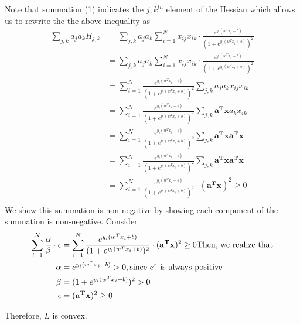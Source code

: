 \documentclass{article}
\begin{document}
Note that summation (1) indicates the \(j,k^{th}\) element of the Hessian which allows us to rewrite the the above inequality as
\begin{align*}
  \sum_{j,k}a_ja_kH_{j,k} 
  &= \sum_{j,k}a_ja_k\sum_{i=1}^{N}x_{ij}x_{ik}\cdot\frac{e^{y_{i}(w^{T}x_{i}+b)}}{(1+e^{y_{i}(w^{T}x_{i}+b)})^{2}}\\
  &= \sum_{j,k}a_ja_k\sum_{i=1}^{N}x_{ij}x_{ik}\cdot\frac{e^{y_{i}(w^{T}x_{i}+b)}}{(1+e^{y_{i}(w^{T}x_{i}+b)})^{2}}\\
  &= \sum_{i=1}^{N}\frac{e^{y_{i}(w^{T}x_{i}+b)}}{(1+e^{y_{i}(w^{T}x_{i}+b)})^{2}}\sum_{j,k}a_ja_kx_{ij}x_{ik}\\
  &= \sum_{i=1}^{N}\frac{e^{y_{i}(w^{T}x_{i}+b)}}{(1+e^{y_{i}(w^{T}x_{i}+b)})^{2}}\sum_{j,k}\mathbf{a^Tx}a_kx_{ik}\\
  &= \sum_{i=1}^{N}\frac{e^{y_{i}(w^{T}x_{i}+b)}}{(1+e^{y_{i}(w^{T}x_{i}+b)})^{2}}\sum_{j,k}\mathbf{a^Tx}\mathbf{a^Tx}\\
  &= \sum_{i=1}^{N}\frac{e^{y_{i}(w^{T}x_{i}+b)}}{(1+e^{y_{i}(w^{T}x_{i}+b)})^{2}}\sum_{j,k}\mathbf{a^Tx}\mathbf{a^Tx}\\
  &= \sum_{i=1}^{N}\frac{e^{y_{i}(w^{T}x_{i}+b)}}{(1+e^{y_{i}(w^{T}x_{i}+b)})^{2}}\cdot(\mathbf{a^Tx})^2 \geq 0\\
\end{align*}
We show this summation is non-negative by showing each component of the summation is non-negative. Consider
\begin{align*}
  \sum_{i=1}^{N}\frac{\alpha}{\beta}\cdot\epsilon
  &= \sum_{i=1}^{N}\frac{e^{y_{i}(w^{T}x_{i}+b)}}{(1+e^{y_{i}(w^{T}x_{i}+b)})^{2}}\cdot(\mathbf{a^Tx})^2 \geq 0
\textnormal{Then, we realize that}\\
\alpha &= e^{y_{i}(w^{T}x_{i}+b)} > 0, \textnormal{since } e^z \textnormal{ is always positive}\\
\beta &= (1+e^{y_{i}(w^{T}x_{i}+b)})^{2} > 0\\
\epsilon &= (\mathbf{a^Tx})^2 \geq 0\\
\end{align*}

Therefore, \(L\) is convex. 
\end{document}
